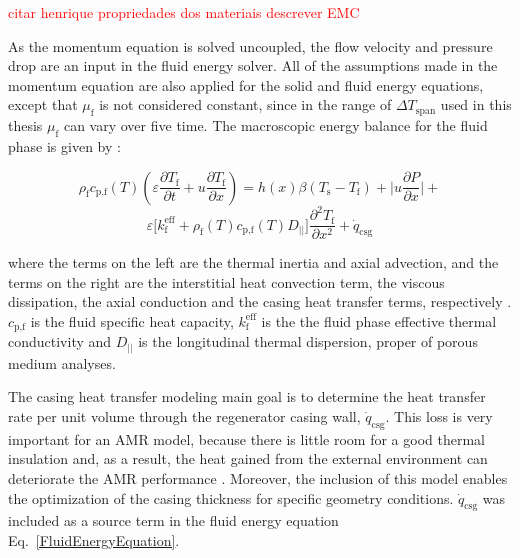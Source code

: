 \documentclass[review,preprint,12pt]{elsarticle}
\begin{document}
\textcolor{red}{citar henrique propriedades dos materiais}
\textcolor{red}{descrever EMC}


As the momentum equation is solved uncoupled, the flow velocity and pressure drop are an input in the fluid energy solver. All of the assumptions made in the momentum equation are also applied for the solid and fluid energy equations, except that $\mu_\textrm{f}$ is not considered constant, since in the range of $\Delta T_\textrm{span}$ used in this thesis $\mu_\textrm{f}$ can vary over five time. The macroscopic energy balance for the fluid phase is given by \cite{Engelbrecht2004,Trevizoli2015}:

\begin{equation}
\rho_\textrm{f} c_\textrm{p,f}(T) \left( \varepsilon \frac{\partial T_\textrm{f}}{\partial t} +  u\frac{\partial T_\textrm{f}}{\partial x} \right) = h(x)\beta(T_\textrm{s}-T_\textrm{f})  + \Biggl|u\frac{\partial P}{\partial x}\Biggr| + \nonumber
\end{equation}
\begin{equation}
\varepsilon\bigl[k^\textrm{eff}_\textrm{f} + \rho_\textrm{f}(T) c_\textrm{p,f}(T)D_{||}\bigr]\frac{\partial^{2} T_\textrm{f}}{\partial x^{2}} +  \dot{q}_\textrm{csg}
\label{FluidEnergyEquation}
\end{equation}

\noindent where the terms on the left are the thermal inertia and axial advection, and the terms on the right are the interstitial heat convection term, the viscous dissipation, the axial conduction and the casing heat transfer terms, respectively \cite{Kaviany1995, Nield2006}. $c_\textrm{p,f}$ is the fluid specific heat capacity, $k^\textrm{eff}_\textrm{f}$ is the the fluid phase effective thermal conductivity and $D_{||}$ is the longitudinal thermal dispersion, proper of porous medium analyses.

The casing heat transfer modeling main goal is to determine the heat transfer rate per unit volume through the regenerator casing wall, $\dot{q}_\textrm{csg}$. This loss is  very important for an AMR model, because there is little room for a good thermal insulation and, as a result, the heat gained from the external environment can deteriorate the AMR performance \cite{Engelbrecht2008,Trevizoli2014,Trevizoli2016b}. Moreover, the inclusion of this model enables the optimization of the casing thickness for specific geometry conditions. $\dot{q}_\textrm{csg}$ was included as a source term in the fluid energy equation Eq.~\eqref{FluidEnergyEquation}. 
\end{document}
